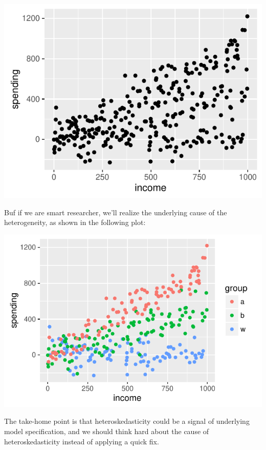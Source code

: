 \documentclass{article}\usepackage[]{graphicx}\usepackage[]{color}
\makeatletter
\def\maxwidth{ %
  \ifdim\Gin@nat@width>\linewidth
    \linewidth
  \else
    \Gin@nat@width
  \fi
}
\newenvironment{knitrout}{}{} %
\makeatother
\begin{document}
\begin{knitrout}
\color{fgcolor}
\includegraphics[width=\maxwidth]{figure/unnamed-chunk-2-1} 

\end{knitrout}

Buf if we are smart researcher, we'll realize the underlying cause of the heterogeneity, as shown in the following plot:

\begin{knitrout}
\color{fgcolor}
\includegraphics[width=\maxwidth]{figure/unnamed-chunk-3-1} 

\end{knitrout}

The take-home point is that heteroskedasticity could be a signal of underlying model specification, and we should think hard about the cause of heteroskedasticity instead of applying a quick fix.
\end{document}
